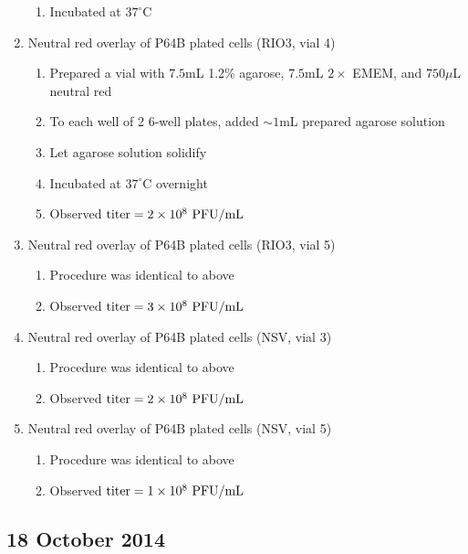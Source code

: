 \begin{enumerate}
\begin{enumerate}
			\item Incubated at $37^{\circ}$C
		\end{enumerate}
	\item Neutral red overlay of P64B plated cells (RIO3, vial 4)
		\begin{enumerate}
			\item Prepared a vial with $7.5$mL 1.2\% agarose, $7.5$mL $2\times$ EMEM, and $750\mu$L neutral red
			\item To each well of 2 6-well plates, added $\sim 1$mL prepared agarose solution
			\item Let agarose solution solidify
			\item Incubated at $37^{\circ}$C overnight
			\item Observed $\text{titer}=2\times 10^{8}\text{ PFU/mL}$
		\end{enumerate}
	\item Neutral red overlay of P64B plated cells (RIO3, vial 5)
		\begin{enumerate}
			\item Procedure was identical to above
			\item Observed $\text{titer}=3\times 10^{8}\text{ PFU/mL}$
		\end{enumerate}
	\item Neutral red overlay of P64B plated cells (NSV, vial 3)
		\begin{enumerate}
			\item Procedure was identical to above
			\item Observed $\text{titer}=2\times 10^{8}\text{ PFU/mL}$
		\end{enumerate}
	\item Neutral red overlay of P64B plated cells (NSV, vial 5)
		\begin{enumerate}
			\item Procedure was identical to above
			\item Observed $\text{titer}=1\times 10^{8}\text{ PFU/mL}$
		\end{enumerate}
\end{enumerate}


\subsection*{18 October 2014}

